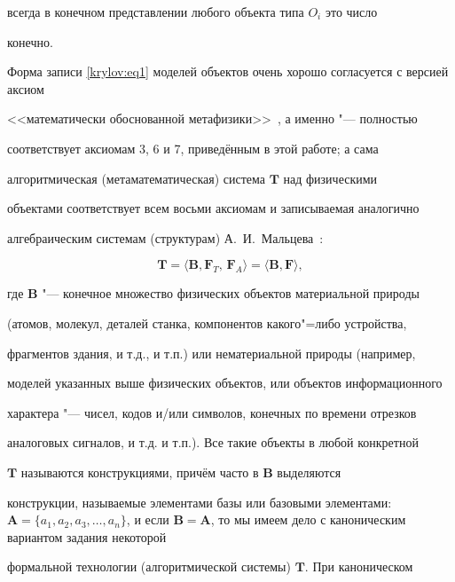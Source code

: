 всегда в конечном представлении любого объекта типа $O_i$ это число

конечно.



Форма записи \eqref{krylov:eq1} моделей объектов очень хорошо согласуется с версией аксиом

<<математически обоснованной метафизики>>~\cite{krylov:bib4}, а именно "--- полностью

соответствует аксиомам 3, 6 и 7, приведённым в этой работе; а сама

алгоритмическая (метаматематическая) система $\mathbf{T}$ над физическими

объектами соответствует всем восьми аксиомам и записываемая аналогично

алгебраическим системам (структурам) А.~И.~Мальцева~\cite{krylov:bib5,krylov:bib6}:

\begin{equation}

\label{krylov:eq2}

\mathbf{T}= \langle \mathbf{B}, \mathbf{F}_{T},\, \mathbf{F}_{A}\rangle =

\langle \mathbf{B}, \mathbf{F}\rangle,

\end{equation}

где $\mathbf{B}$ "--- конечное множество физических объектов материальной природы

(атомов, молекул, деталей станка, компонентов какого"=либо устройства,

фрагментов здания, и т.д., и т.п.) или нематериальной природы (например,

моделей указанных выше физических объектов, или объектов информационного

характера "--- чисел, кодов и/или символов, конечных по времени отрезков

аналоговых сигналов, и т.д. и т.п.). Все такие объекты в любой конкретной

$\mathbf{T}$ называются конструкциями, причём часто в $\mathbf{B}$ выделяются

конструкции, называемые элементами базы или базовыми элементами: $\mathbf{

A}=\{a_1, a_2, a_3,\ldots, a_n\}$, и если $\mathbf{B}=

\mathbf{A}$, то мы имеем дело с каноническим вариантом задания некоторой

формальной технологии (алгоритмической системы) $\mathbf{T}$. При каноническом

